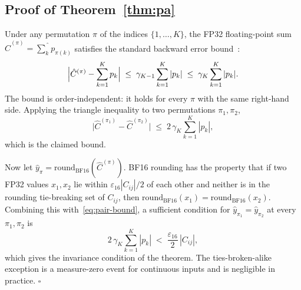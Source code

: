 \documentclass{article}
\begin{document}
\subsection*{Proof of Theorem~\ref{thm:pa}}
Under any permutation $\pi$ of the indices $\{1,\dots,K\}$, the FP32 floating-point
sum $\hat C^{(\pi)}\!=\!\widehat{\sum_{k}}p_{\pi(k)}$ satisfies the standard
backward error bound~\cite[Eq.~4.4]{higham2002accuracy}:
\begin{equation}
\Bigl|\hat C^{(\pi)} - \sum_{k=1}^{K} p_k\Bigr|
\;\le\; \gamma_{K-1}\sum_{k=1}^{K}|p_k|
\;\le\; \gamma_K\sum_{k=1}^{K}|p_k|.
\label{eq:perm-bound}
\end{equation}
The bound is order-independent: it holds for every $\pi$ with the same right-hand
side. Applying the triangle inequality to two permutations $\pi_1, \pi_2$,
\begin{equation}
\bigl|\hat C^{(\pi_1)} - \hat C^{(\pi_2)}\bigr|
\;\le\; 2\,\gamma_K\sum_{k=1}^{K}|p_k|,
\label{eq:pair-bound}
\end{equation}
which is the claimed bound.

Now let $\hat y_\pi\!=\!\mathrm{round}_{\text{BF16}}(\hat C^{(\pi)})$. BF16 rounding
has the property that if two FP32 values $x_1, x_2$ lie within
$\varepsilon_{16}|C_{ij}|/2$ of each other and neither is in the rounding
tie-breaking set of $C_{ij}$, then $\mathrm{round}_{\text{BF16}}(x_1)=\mathrm{round}_{\text{BF16}}(x_2)$.
Combining this with~\eqref{eq:pair-bound}, a sufficient condition for
$\hat y_{\pi_1}=\hat y_{\pi_2}$ at every $\pi_1,\pi_2$ is
\begin{equation}
2\,\gamma_K\sum_{k=1}^{K}|p_k| \;<\; \frac{\varepsilon_{16}}{2}\,|C_{ij}|,
\label{eq:suff}
\end{equation}
which gives the invariance condition of the theorem. The ties-broken-alike
exception is a measure-zero event for continuous inputs and is negligible in
practice. $\square$
\end{document}

